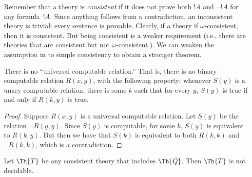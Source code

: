 \documentclass[../../../include/open-logic-section]{subfiles}
\begin{document}


\begin{explain}
Remember that a theory is \emph{consistent} if it does not prove both
$!A$ and $\lnot !A$ for any formula~$!A$. Since anything follows from
a contradiction, an inconsistent theory is trivial: every sentence is
provable. Clearly, if a theory if $\omega$-consistent, then it is
consistent. But being consistent is a weaker requirement (i.e., there
are theories that are consistent but not $\omega$-consistent.). We can
weaken the assumption in  to simple
consistency to obtain a stronger theorem.
\end{explain}

\begin{lem}
There is no ``universal computable relation.'' That is, there is no
binary computable relation $R(x,y)$, with the following property:
whenever $S(y)$ is a unary computable relation, there is some $k$ such
that for every $y$, $S(y)$ is true if and only if $R(k,y)$ is true.
\end{lem}

\begin{proof}
Suppose $R(x,y)$ is a universal computable relation. Let $S(y)$
be the relation $\lnot R(y,y)$. Since $S(y)$ is computable, for some
$k$, $S(y)$ is equivalent to $R(k,y)$. But then we have that $S(k)$ is
equivalent to both $R(k,k)$ and $\lnot R(k,k)$, which is a
contradiction.
\end{proof}


\begin{thm}
Let $\Th{T}$ be any consistent theory that includes $\Th{Q}$. Then
$\Th{T}$ is not decidable.
\end{thm}
\end{document}
